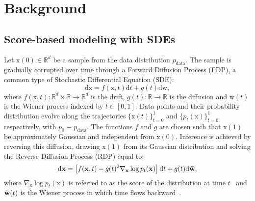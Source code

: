 \documentclass{article}
\newcommand{\x}{\boldsymbol{\mathrm{x}}}
\newcommand{\w}{\boldsymbol{\mathrm{w}}}
\newcommand{\wb}{\boldsymbol{\Bar{\mathrm{w}}}}
\newcommand{\dr}{\mathrm{d}}
\begin{document}
\section{Background}

\subsection{Score-based modeling with SDEs}

Let $\x(0) \in \mathbb{R}^d$ be a sample from the data distribution $p_{\text{data}}$. 
The sample is gradually corrupted over time through a Forward Diffusion Process (FDP), a common type of Stochastic Differential Equation (SDE): \begin{equation}\label{eq:forward}
\dr\x = f(\x,t)\dr t + g(t)\dr \w,
\end{equation}
where $f(\x,t): \mathbb{R}^d \times \mathbb{R} \to \mathbb{R}^d$ is the drift, $g(t): \mathbb{R} \to \mathbb{R}$ is the diffusion and $\w(t)$ is the Wiener process indexed by $t \in [0,1]$. Data points and their probability distribution evolve along the trajectories $\{ \x(t) \}_{t=0}^1$ and $\{p_t(\x) \}_{t=0}^1$ respectively, with $p_0 \equiv p_{\text{data}}$. 
The functions $f$ and $g$ are chosen such that $\x(1)$ be approximately Gaussian and independent from $\x(0)$. 
Inference is achieved by reversing this diffusion, drawing $\x(1)$ from its Gaussian distribution and solving the Reverse Diffusion Process (RDP) equal to:
\begin{equation}\label{eq:backward}
    \dr\x = \left[ f(\x,t)-g(t)^2\nabla_{\x} \log p_t(\x) \right] \dr t + g(t)\dr \wb,
\end{equation}
where $\nabla_{\x} \log p_t(\x)$ is referred to as the score
of the distribution at time $t$~\citep{hyvarinen2005estimation} and $\wb(t)$ is the Wiener process in which time flows backward~\citep{anderson1982reverse}.
\end{document}
